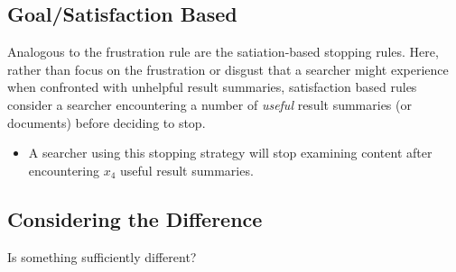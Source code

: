 
\subsection{Goal/Satisfaction Based}
Analogous to the frustration rule are the satiation-based stopping rules. Here, rather than focus on the frustration or disgust that a searcher might experience when confronted with unhelpful result summaries, satisfaction based rules consider a searcher encountering a number of \emph{useful} result summaries (or documents) before deciding to stop.

\begin{itemize}
    
    \item[]{} A searcher using this stopping strategy will stop examining content after encountering $x_4$ useful result summaries.
    
\end{itemize}

\subsection{Considering the Difference}
Is something sufficiently different?


